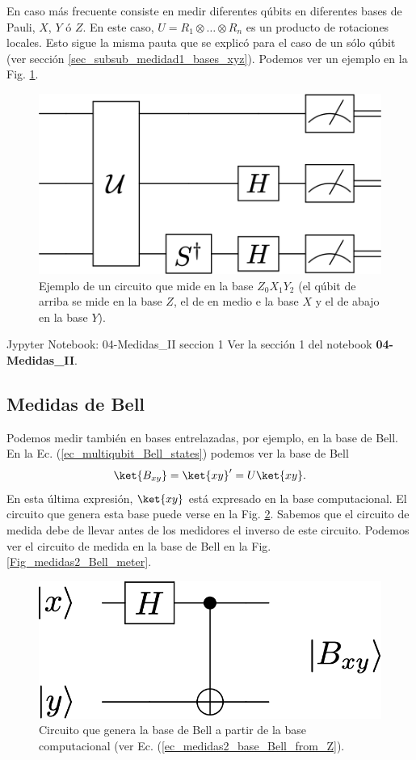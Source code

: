 \documentclass[a4paper,11pt]{book} %
\numberwithin{equation}{chapter}
\begin{document}
En caso más frecuente consiste en medir diferentes qúbits en diferentes bases de Pauli, $X$, $Y$ ó $Z$. En este caso, $U= R_1\otimes \ldots \otimes R_n$ es un producto de rotaciones locales. Esto sigue la misma pauta que se explicó para el caso de un sólo qúbit (ver sección \ref{sec_subsub_medidad1_bases_xyz}). Podemos ver un ejemplo en la Fig. \ref{Fig_medidas2_XYZ_multimeter}.

	\begin{figure}[H]
	\centering 
	\includegraphics[width=0.3\linewidth]{Figuras/Fig_medidas2_XYZ_multimeter}
	\caption{Ejemplo de un circuito que mide en la base $Z_0X_1Y_2$ (el qúbit de arriba se mide en la base $Z$, el de en medio e la base $X$ y el de abajo en la base $Y$).}
	\label{Fig_medidas2_XYZ_multimeter}
	\end{figure}


	\begin{mybox_orange}{Jypyter Notebook: 04-Medidas\_II  seccion 1}
	Ver la sección 1 del notebook \textbf{04-Medidas\_II}.
	\end{mybox_orange}


        \subsection{Medidas de Bell}

Podemos medir también en bases entrelazadas, por ejemplo, en la base de Bell. En la Ec. (\ref{ec_multiqubit_Bell_states}) podemos ver la base de Bell 
	\begin{equation} \label{ec_medidas2_base_Bell_from_Z}
	\ket{B_{xy}} = \ket{xy}'  = U \ket{xy}.
	\end{equation}
En esta última expresión, $\ket{xy}$ está expresado en la base computacional.  El circuito que genera esta base puede verse en la Fig. \ref{Fig_medidas2_circuit_Bell_basis}. Sabemos que el circuito de medida debe de llevar antes de los medidores el inverso de este circuito. Podemos ver el circuito de medida en la base de Bell en la Fig. \ref{Fig_medidas2_Bell_meter}.

	\begin{figure}[H]
	\centering 
	\includegraphics[width=0.25\linewidth]{Figuras/Fig_medidas2_circuit_Bell_basis}
	\caption{Circuito que genera la base de Bell a partir de la base computacional (ver Ec. (\ref{ec_medidas2_base_Bell_from_Z}).}
	\label{Fig_medidas2_circuit_Bell_basis}
	\end{figure}
\end{document}
